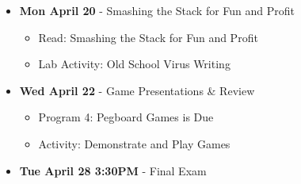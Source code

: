 \begin{itemize}
\item\textbf{Mon April 20} - Smashing the Stack for Fun and Profit
    \begin{itemize}
        \item Read: Smashing the Stack for Fun and Profit
        \item Lab Activity: Old School Virus Writing
    \end{itemize}
\item\textbf{Wed April 22} - Game Presentations \& Review
    \begin{itemize}
        \item Program 4: Pegboard Games is Due
        \item Activity: Demonstrate and Play Games
    \end{itemize}
\item\textbf{Tue April 28 3:30PM} - Final Exam
\end{itemize}
\hrulefill
